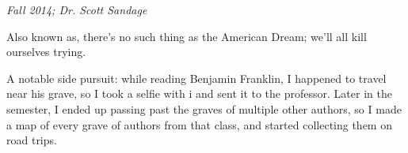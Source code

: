 \textit{Fall 2014; Dr. Scott Sandage}

Also known as, there's no such thing as the American Dream; we'll all kill
ourselves trying.

A notable side pursuit: while reading Benjamin Franklin, I happened to travel
near his grave, so I took a selfie with i and sent it to the professor.
Later in the semester, I ended up passing past the graves of multiple
other authors, so I made a map of every grave of authors from that class, and
started collecting them on road trips.





\groupendnotes

